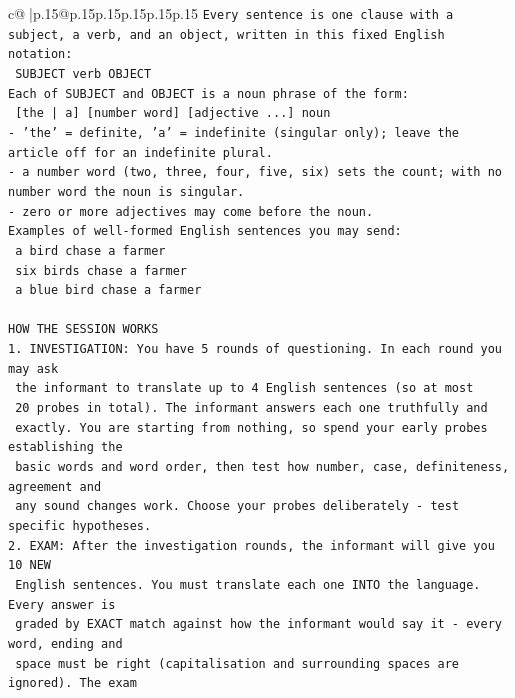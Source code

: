 \documentclass{article}
\begin{document}
{\begin{supertabular}{c@{$\;$}|p{.15\linewidth}@{}p{.15\linewidth}p{.15\linewidth}p{.15\linewidth}p{.15\linewidth}p{.15\linewidth}}
{{{\texttt{Every sentence is one clause with a subject, a verb, and an object, written in this fixed English notation:} \\
\texttt{    SUBJECT  verb  OBJECT} \\
\texttt{Each of SUBJECT and OBJECT is a noun phrase of the form:} \\
\texttt{    {[}the | a{]}  {[}number word{]}  {[}adjective ...{]}  noun} \\
\texttt{{-} 'the' = definite, 'a' = indefinite (singular only); leave the article off for an indefinite plural.} \\
\texttt{{-} a number word (two, three, four, five, six) sets the count; with no number word the noun is singular.} \\
\texttt{{-} zero or more adjectives may come before the noun.} \\
\texttt{Examples of well{-}formed English sentences you may send:} \\
\texttt{    a bird chase a farmer} \\
\texttt{    six birds chase a farmer} \\
\texttt{    a blue bird chase a farmer} \\
\\ 
\texttt{HOW THE SESSION WORKS} \\
\texttt{1. INVESTIGATION: You have 5 rounds of questioning. In each round you may ask} \\
\texttt{   the informant to translate up to 4 English sentences (so at most} \\
\texttt{   20 probes in total). The informant answers each one truthfully and} \\
\texttt{   exactly. You are starting from nothing, so spend your early probes establishing the} \\
\texttt{   basic words and word order, then test how number, case, definiteness, agreement and} \\
\texttt{   any sound changes work. Choose your probes deliberately {-} test specific hypotheses.} \\
\texttt{2. EXAM: After the investigation rounds, the informant will give you 10 NEW} \\
\texttt{   English sentences. You must translate each one INTO the language. Every answer is} \\
\texttt{   graded by EXACT match against how the informant would say it {-} every word, ending and} \\
\texttt{   space must be right (capitalisation and surrounding spaces are ignored). The exam} \\
}}}
\end{supertabular}}
\end{document}
